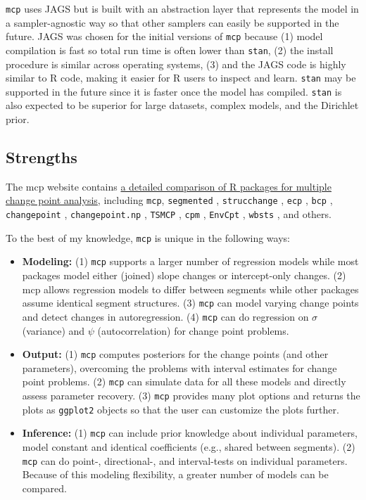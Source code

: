\documentclass[
  american,
]{article}
\begin{document}
\texttt{mcp} uses JAGS \citep{plummer2003} but is built with an abstraction layer that represents the model in a sampler-agnostic way so that other samplers can easily be supported in the future. JAGS was chosen for the initial versions of \texttt{mcp} because (1) model compilation is fast so total run time is often lower than \texttt{stan}, (2) the install procedure is similar across operating systems, (3) and the JAGS code is highly similar to R code, making it easier for R users to inspect and learn. \texttt{stan} \citep{carpenter2017} may be supported in the future since it is faster once the model has compiled. \texttt{stan} is also expected to be superior for large datasets, complex models, and the Dirichlet prior.

\hypertarget{strengths}{%
\subsection{Strengths}\label{strengths}}

The mcp website contains \href{https://lindeloev.github.io/mcp/articles/packages.html}{a detailed comparison of R packages for multiple change point analysis}, including \texttt{mcp}, \texttt{segmented} \citep{muggeo2008}, \texttt{strucchange} \citep[\citet{zeileis2003}]{zeileis2002}, \texttt{ecp} \citep{james2015}, \texttt{bcp} \citep{erdman2007}, \texttt{changepoint} \citep{killick2014}, \texttt{changepoint.np} \citep{haynes2019}, \texttt{TSMCP} \citep{li2018}, \texttt{cpm} \citep{ross2015}, \texttt{EnvCpt} \citep{killick2018}, \texttt{wbsts} \citep{korkas2018}, and others.

To the best of my knowledge, \texttt{mcp} is unique in the following ways:

\begin{itemize}
\item
  \textbf{Modeling:} (1) \texttt{mcp} supports a larger number of regression models while most packages model either (joined) slope changes or intercept-only changes. (2) mcp allows regression models to differ between segments while other packages assume identical segment structures. (3) \texttt{mcp} can model varying change points and detect changes in autoregression. (4) \texttt{mcp} can do regression on \(\sigma\) (variance) and \(\psi\) (autocorrelation) for change point problems.
\item
  \textbf{Output:} (1) \texttt{mcp} computes posteriors for the change points (and other parameters), overcoming the problems with interval estimates for change point problems. (2) \texttt{mcp} can simulate data for all these models and directly assess parameter recovery. (3) \texttt{mcp} provides many plot options and returns the plots as \texttt{ggplot2} objects so that the user can customize the plots further.
\item
  \textbf{Inference:} (1) \texttt{mcp} can include prior knowledge about individual parameters, model constant and identical coefficients (e.g., shared between segments). (2) \texttt{mcp} can do point-, directional-, and interval-tests on individual parameters. Because of this modeling flexibility, a greater number of models can be compared.
\end{itemize}
\end{document}
